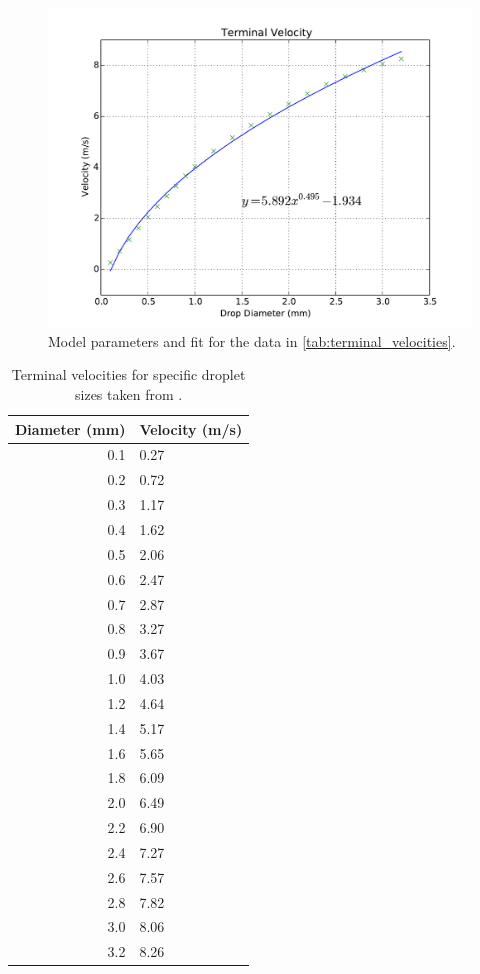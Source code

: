 \documentclass[twocolumn,a4paper,10pt]{article}
\begin{document}
\begin{figure}[h]
    \centering
    \includegraphics[width=1.00\linewidth]{terminal_velocity_model.pdf}
    \caption{Model parameters and fit for the data in
        \autoref{tab:terminal_velocities}.}
    \label{fig:terminal_velocities}
\end{figure}

\begin{table}[h]
    \centering
    \begin{tabular}{|r|l|}
        \hline
        Diameter (mm) &  Velocity (m/s) \\
        \hline
        0.1 &            0.27 \\
        0.2 &            0.72 \\
        0.3 &            1.17 \\
        0.4 &            1.62 \\
        0.5 &            2.06 \\
        0.6 &            2.47 \\
        0.7 &            2.87 \\
        0.8 &            3.27 \\
        0.9 &            3.67 \\
        1.0 &            4.03 \\
        1.2 &            4.64 \\
        1.4 &            5.17 \\
        1.6 &            5.65 \\
        1.8 &            6.09 \\
        2.0 &            6.49 \\
        2.2 &            6.90 \\
        2.4 &            7.27 \\
        2.6 &            7.57 \\
        2.8 &            7.82 \\
        3.0 &            8.06 \\
        3.2 &            8.26 \\
        \hline
    \end{tabular}
    \caption{Terminal velocities for specific droplet sizes taken from
        \citet{hu1998}.}
    \label{tab:terminal_velocities}
\end{table}
\end{document}
